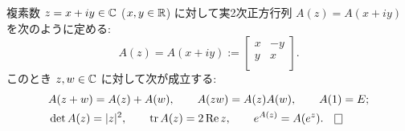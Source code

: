 \documentclass[12pt,twoside]{jarticle}
\begin{document}
\begin{question}[5点]
  \label{q:C->M2(R)}
  複素数 $z = x + iy\in{\mathbb C}$ ($x,y\in{\mathbb R}$) に対して実2次正方行列 $A(z)=A(x+iy)$ 
  を次のように定める:
  \begin{equation*}
    A(z) = A(x+iy) :=
    \begin{bmatrix}
      x & -y \\
      y &  x \\
    \end{bmatrix}.
  \end{equation*}
  このとき $z,w\in{\mathbb C}$ に対して次が成立する:
  \begin{align*}
    &
    A(z+w) = A(z) + A(w), \qquad
    A(zw) = A(z)A(w), \qquad
    A(1) = E;
    \\ &
    \det A(z) = |z|^2, \qquad
    \trace A(z) = 2\Repart z, \qquad
    e^{A(z)} = A(e^z).
    \qed
  \end{align*}
\end{question}

\end{document}

